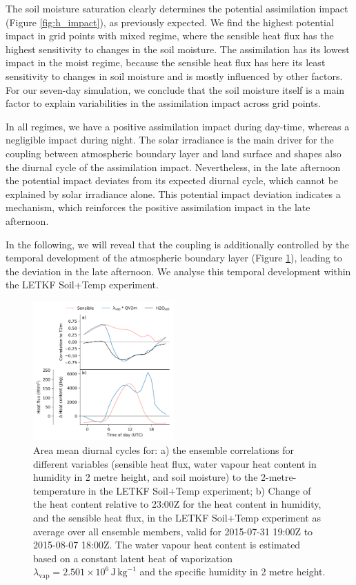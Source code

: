 \documentclass[hess, manuscript]{copernicus}
\begin{document}
The soil moisture saturation clearly determines the potential assimilation impact (Figure \ref{fig:h_impact}), as previously expected.
We find the highest potential impact in grid points with mixed regime, where the sensible heat flux has the highest sensitivity to changes in the soil moisture.
The assimilation has its lowest impact in the moist regime, because the sensible heat flux has here its least sensitivity to changes in soil moisture and is mostly influenced by other factors.
For our seven-day simulation, we conclude that the soil moisture itself is a main factor to explain variabilities in the assimilation impact across grid points.

In all regimes, we have a positive assimilation impact during day-time, whereas a negligible impact during night.
The solar irradiance is the main driver for the coupling between atmospheric boundary layer and land surface and shapes also the diurnal cycle of the assimilation impact.
Nevertheless, in the late afternoon the potential impact deviates from its expected diurnal cycle, which cannot be explained by solar irradiance alone.
This potential impact deviation indicates a mechanism, which reinforces the positive assimilation impact in the late afternoon.

In the following, we will reveal that the coupling is additionally controlled by the temporal development of the atmospheric boundary layer (Figure \ref{fig:cycle_corr}), leading to the deviation in the late afternoon.
We analyse this temporal development within the LETKF Soil+Temp experiment.

\begin{figure}[ht]
	\includegraphics[width=0.48\textwidth]{figures/fig_10_cycle_corr.png}
	\caption{
		Area mean diurnal cycles for: a) the ensemble correlations for different variables (sensible heat flux, water vapour heat content in humidity in 2 metre height, and soil moisture) to the 2-metre-temperature in the LETKF Soil+Temp experiment; b) Change of the heat content relative to 23:00Z for the heat content in humidity, and the sensible heat flux, in the LETKF Soil+Temp experiment as average over all ensemble members, valid for 2015-07-31 19:00Z to 2015-08-07 18:00Z. The water vapour heat content is estimated based on a constant latent heat of vaporization $\lambda_{\text{vap}} = 2.501 \times 10^6\, \text{J}\, \text{kg}^{-1}$ and the specific humidity in 2 metre height.
	}
	\label{fig:cycle_corr}
\end{figure}
\end{document}
